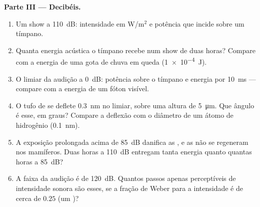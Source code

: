 \begin{problem}
\medskip
\noindent\textbf{Parte III --- Decibéis.}
\begin{enumerate}[resume]
  \item Um show a \qty{110}{dB}: intensidade em W/m$^{2}$ e potência que
        incide sobre um tímpano.
  \item Quanta energia acústica o tímpano recebe num show de duas horas?
        Compare com a energia de uma gota de chuva em queda
        (\qty{1e-4}{J}).
  \item O limiar da audição a \qty{0}{dB}: potência sobre o tímpano e
        energia por \qty{10}{ms} --- compare com a energia de um fóton
        visível.
  \item O tufo de  se deflete \qty{0.3}{nm} no limiar, sobre uma
        altura de \qty{5}{\micro m}. Que ângulo é esse, em graus?
        Compare a deflexão com o diâmetro de um átomo de hidrogênio
        (\qty{0.1}{nm}).
  \item A exposição prolongada acima de \qty{85}{dB} danifica as , e as  não se regeneram nos mamíferos.
        Duas horas a \qty{110}{dB} entregam tanta energia quanto quantas
        horas a \qty{85}{dB}?
  \item A faixa da audição é de \qty{120}{dB}. Quantos passos apenas
        perceptíveis de intensidade sonora são esses, se a fração de
        Weber para a intensidade é de cerca de $0.25$ (um )?
\end{enumerate}


\end{problem}
